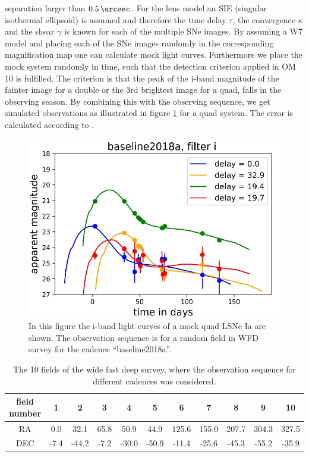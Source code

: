 separation larger than $\SI{0.5}{\arcsec}$. For the lens model an SIE
(singular isothermal ellipsoid) \citep{Kormann:1994} is assumed and
therefore the time delay $\tau$, the convergence $\kappa$ and the
shear $\gamma$ is known for each of the multiple SNe images. By
assuming a W7 model and placing each of the SNe images randomly in the
corresponding magnification map one can calculate mock light
curves. Furthermore we place the mock system randomly in time, such
that the detection criterion applied in OM 10 is fulfilled. The
criterion is that the peak of the i-band magnitude of the fainter image
for a double or the 3rd brightest image for a quad, falls in the
observing season.
By combining this with the observing sequence, we get simulated
observations as illustrated in figure \ref{fig: simulated observation}
for a quad system. The error is calculated according to \cite[sec 3.5,
p. 67]{2009:LSSTscience}.
\begin{figure}[h!]
\centering
\includegraphics[scale=0.7]{figures/sl_Obsevation_number399_baseline2018a_filter_i_oversampling_00.pdf}
\caption[]{In this figure the i-band light curves of a mock quad LSNe Ia are shown. The observation sequence is for a random field in WFD survey for the cadence ``baseline2018a''.}
\label{fig: simulated observation}
\end{figure}
%
\begin{table}
\centering
\begin{tabular}{c|c|c|c|c|c|c|c|c|c|c}
field number & 1 & 2 & 3 & 4 & 5& 6 & 7 & 8 & 9 & 10  \\
\hline
RA& 0.0 & 32.1 & 65.8 & 50.9 &44.9& 125.6 & 155.0 & 207.7 & 304.3 & 327.5  \\
\hline
DEC& -7.4 & -44.2 & -7.2 & -30.0 & -50.9& -11.4 & -25.6 & -45.3 & -55.2 & -35.9  \\
\end{tabular}
\caption{The 10 fields of the wide fast deep survey, where the observation sequence for different cadences was considered.}
\label{tab: 10 wfd fields}
\end{table}
%

